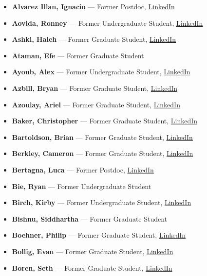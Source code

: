 \documentclass[12pt,a4paper]{article}
\begin{document}
\begin{itemize}
    \item \textbf{Alvarez Illan, Ignacio} --- Former Postdoc, \href{https://www.linkedin.com/in/ialvarezillan/}{LinkedIn}
    \item \textbf{Aovida, Ronney} --- Former Undergraduate Student, \href{https://www.linkedin.com/in/ronney-aovida-411a01104/}{LinkedIn}
    \item \textbf{Ashki, Haleh} --- Former Graduate Student, \href{https://www.linkedin.com/in/haleh-ashki-a4427429/}{LinkedIn}
    \item \textbf{Ataman, Efe} --- Former Graduate Student
    \item \textbf{Ayoub, Alex} --- Former Undergraduate Student, \href{https://www.linkedin.com/in/alex-ayoub-212a41132/}{LinkedIn}
    \item \textbf{Azbill, Bryan} --- Former Graduate Student, \href{https://www.linkedin.com/in/bryan-azbill-a9003513b/}{LinkedIn}
    \item \textbf{Azoulay, Ariel} --- Former Graduate Student, \href{https://www.linkedin.com/in/ariel-azoulay-9566271b/}{LinkedIn}
    \item \textbf{Baker, Christopher} --- Former Graduate Student, \href{https://www.linkedin.com/in/christopher-baker-455b8535/}{LinkedIn}
    \item \textbf{Bartoldson, Brian} --- Former Graduate Student, \href{https://www.linkedin.com/in/brian-bartoldson-98585934/}{LinkedIn}
    \item \textbf{Berkley, Cameron} --- Former Graduate Student, \href{https://www.linkedin.com/in/cameron-berkley-37058285/}{LinkedIn}
    \item \textbf{Bertagna, Luca} --- Former Postdoc, \href{https://www.linkedin.com/in/lucabertagna/}{LinkedIn}
    \item \textbf{Bie, Ryan} --- Former Undergraduate Student
    \item \textbf{Birch, Kirby} --- Former Undergraduate Student, \href{https://www.linkedin.com/in/kirby-birch-53a547b7/}{LinkedIn}
    \item \textbf{Bishnu, Siddhartha} --- Former Graduate Student
    \item \textbf{Boehner, Philip} --- Former Graduate Student, \href{https://www.linkedin.com/in/philip-boehner-61a7a288/}{LinkedIn}
    \item \textbf{Bollig, Evan} --- Former Graduate Student, \href{https://www.linkedin.com/in/evan-bollig-11b01211/}{LinkedIn}
    \item \textbf{Boren, Seth} --- Former Graduate Student, \href{https://www.linkedin.com/in/seth-boren-b17b2b115/}{LinkedIn}

\end{itemize}
\end{document}
